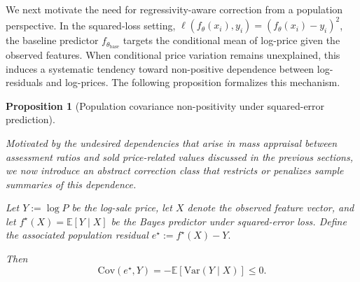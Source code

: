 \documentclass[12pt, draft]{article}
\theoremstyle{plain}
\newtheorem{proposition}{Proposition}
\theoremstyle{definition}
\newcommand{\E}{\mathbb{E}}
\newcommand{\1}{\mathbf{1}}
\newcommand{\Cov}{\text{Cov}}
\newcommand{\Var}{\text{Var}}
\begin{document}
{We next motivate the need for regressivity-aware correction from a population perspective. In the squared-loss setting, $\ell(f_\theta(x_i), y_i)=(f_\theta(x_i)- y_i)^2$, the baseline predictor $f_{\theta_\mathrm{base}}$ targets the conditional mean of log-price given the observed features. When conditional price variation remains unexplained, this induces a systematic tendency toward non-positive dependence between log-residuals and log-prices. The following proposition formalizes this mechanism.



\begin{proposition}[Population covariance non-positivity under squared-error prediction]
\label{prop:population_covariance_identity}

Motivated by the undesired dependencies that arise in mass appraisal between assessment ratios and sold price-related values discussed in the previous sections, we now introduce an abstract correction class that restricts or penalizes sample summaries of this dependence.


Let $Y:=\log P$ be the log-sale price, let $X$ denote the observed feature vector, and let
$
f^\star(X)=\E[Y\mid X]
$
be the Bayes predictor under squared-error loss. Define the associated population residual
$
e^\star:=f^\star(X)-Y.
$

Then
\begin{equation}
\label{eq:covariance_population_identity}
\Cov(e^\star,Y)
=
-\E[\Var(Y\mid X)]
\le 0.
\end{equation}
\end{proposition}

}
\end{document}
